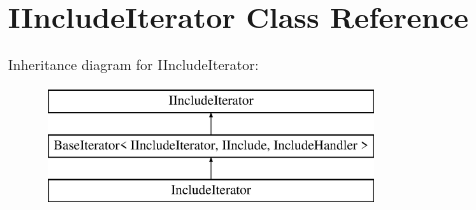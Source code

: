 \hypertarget{class_i_include_iterator}{}\section{I\+Include\+Iterator Class Reference}
\label{class_i_include_iterator}
Inheritance diagram for I\+Include\+Iterator\+:\begin{figure}[H]
\begin{center}
\leavevmode
\includegraphics[height=3.000000cm]{class_i_include_iterator}
\end{center}
\end{figure}
